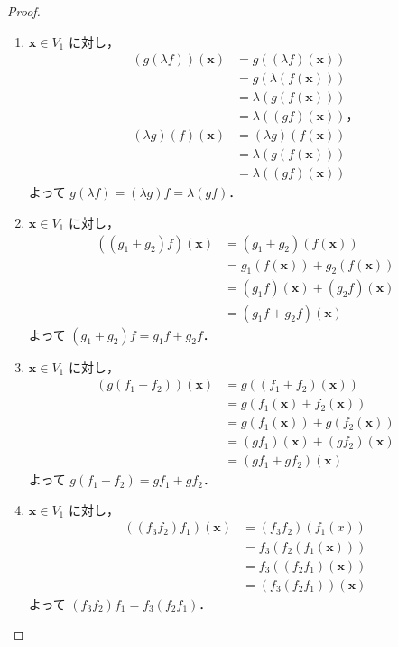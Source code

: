 \documentclass{jlreq}
\theoremstyle{definition}
\begin{document}
      \begin{proof}
        \mbox{}
        \begin{enumerate}
          \item $\bm{x} \in V_1$ に対し，
            \begin{align*}
              (g(\lambda f))(\bm{x}) &= g((\lambda f)(\bm{x})) \\
              &= g(\lambda(f(\bm{x}))) \\
              &= \lambda(g(f(\bm{x}))) \\
              &= \lambda((gf)(\bm{x}))，\\
              (\lambda g)(f)(\bm{x}) &= (\lambda g)(f(\bm{x})) \\
              &= \lambda(g(f(\bm{x}))) \\
              &= \lambda((gf)(\bm{x}))
            \end{align*}
            よって $g(\lambda f)=(\lambda g)f=\lambda(gf)$．
          \item $\bm{x} \in V_1$ に対し，
            \begin{align*}
              ((g_1+g_2)f)(\bm{x}) &= (g_1+g_2)(f(\bm{x})) \\
              &= g_1(f(\bm{x}))+g_2(f(\bm{x})) \\
              &= (g_1f)(\bm{x})+(g_2f)(\bm{x}) \\
              &= (g_1f+g_2f)(\bm{x})
            \end{align*}
            よって $(g_1+g_2)f=g_1f+g_2f$．
          \item $\bm{x} \in V_1$ に対し，
            \begin{align*}
              (g(f_1+f_2))(\bm{x}) &= g((f_1+f_2)(\bm{x})) \\
              &= g(f_1(\bm{x})+f_2(\bm{x})) \\
              &= g(f_1(\bm{x}))+g(f_2(\bm{x})) \\
              &= (gf_1)(\bm{x})+(gf_2)(\bm{x}) \\
              &= (gf_1+gf_2)(\bm{x})
            \end{align*}
            よって $g(f_1+f_2)=gf_1+gf_2$．
          \item $\bm{x} \in V_1$ に対し，
            \begin{align*}
               ((f_3f_2)f_1)(\bm{x}) &= (f_3f_2)(f_1(x)) \\
               &= f_3(f_2(f_1(\bm{x}))) \\
               &= f_3((f_2f_1)(\bm{x})) \\
               &= (f_3(f_2f_1))(\bm{x})
            \end{align*}
            よって $(f_3f_2)f_1=f_3(f_2f_1)$．
        \end{enumerate}
      \end{proof}
\end{document}
